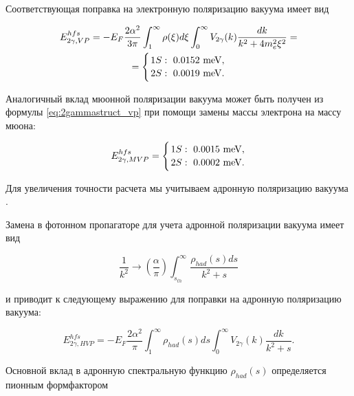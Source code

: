 Соответствующая поправка на электронную поляризацию вакуума имеет вид

\begin{multline}

\label{eq:2gammastruct_vp}

E_{2\gamma,VP}^{hfs}=-E_F\frac{2\alpha^2}{3\pi}\int_1^\infty\rho(\xi)d\xi

\int_0^\infty V_{2\gamma}(k)\frac{dk}{k^2+4m_e^2\xi^2}=

\\

=\Biggl\{{{1S:~0.0152~\rm meV,}\atop{2S:~0.0019~\rm meV.}}

\end{multline}

Аналогичный вклад мюонной поляризации вакуума может быть получен из формулы \eqref{eq:2gammastruct_vp} при помощи замены массы электрона на массу мюона:

\begin{equation}

\label{eq:2gammastruct_mvp}

E_{2\gamma,MVP}^{hfs}=\Biggl\{{{1S:~0.0015~\rm meV,}\atop{2S:~0.0002~\rm meV.}}

\end{equation}

Для увеличения точности расчета мы учитываем адронную поляризацию вакуума \cite{hvp}.

Замена в фотонном пропагаторе для учета адронной поляризации вакуума имеет вид

\begin{equation}

\label{eq:hvp}

\frac{1}{k^2}\to\left(\frac{\alpha}{\pi}\right)\int_{s_{th}}^\infty\frac{\rho_{had}(s)ds}{k^2+s}

\end{equation}

и приводит к следующему выражению для поправки на адронную поляризацию вакуума:

\begin{equation}

\label{eq:hvp_cor}

E_{2\gamma,HVP}^{hfs}=-E_F\frac{2\alpha^2}{\pi}\int_1^\infty\rho_{had}(s)ds

\int_0^\infty V_{2\gamma}(k)\frac{dk}{k^2+s}.

\end{equation}

Основной вклад в адронную спектральную функцию $\rho_{had}(s)$ определяется пионным формфактором

